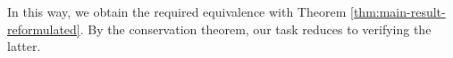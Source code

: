 \documentclass[reqno]{amsart}
\DeclareMathOperator{\GL}{GL}
\DeclareMathOperator{\fin}{fin}
\theoremstyle{plain} \newtheorem{theorem} {Theorem}
\theoremstyle{definition} \newtheorem{definition} [theorem] {Definition}
\theoremstyle{itplain} %
\numberwithin{equation}{section}
\numberwithin{theorem}{section}
\renewcommand{\geq}{\geqslant}
\renewcommand{\leq}{\leqslant}
\begin{document}


In this way, we obtain the required equivalence with Theorem \ref{thm:main-result-reformulated}.  By the conservation theorem, our task reduces to verifying the latter.
\end{document}
